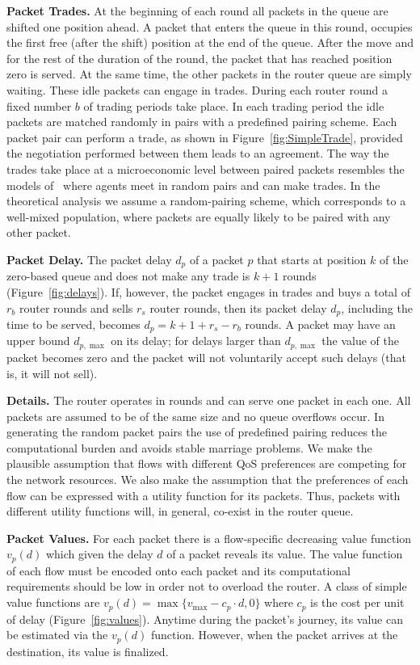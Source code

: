 \documentclass[letterpaper,10pt]{llncs}
\begin{document}
\textbf{Packet Trades.}
At the beginning of each round all packets in the queue are shifted one position ahead.
A packet that enters the queue in this round, occupies the first free (after the shift) 
position at the end of the queue. After the move and for the rest of the duration of the round,
the packet that has reached position zero is served.
At the same time, the other packets
in the router queue are simply waiting. These idle packets can engage in trades.
During each router round a fixed number $b$ of trading periods take place.
In each trading period the idle packets are matched randomly in pairs
with a predefined pairing scheme.
Each packet pair can perform a trade, as shown in Figure~\ref{fig:SimpleTrade},
provided
the negotiation performed between them leads to an agreement.
The way the trades take place at a microeconomic level
between paired packets resembles the models of~\cite{Gi97,KW89}
where agents meet in random pairs and can make trades.
In the theoretical analysis we assume a random-pairing scheme,
which corresponds to a well-mixed population, where packets 
are equally likely to be paired with any other packet. 

\textbf{Packet Delay.}
The packet delay $d_p$ of a packet $p$ that starts at position $k$
of the zero-based queue and does not make any trade is $k+1$ rounds (Figure~\ref{fig:delays}).
If, however, the packet engages in trades and buys a total of $r_b$ router rounds
and sells $r_s$ router rounds, then its packet delay $d_p$, including the time to be served,
becomes $d_p = k + 1 + r_s - r_b$ rounds. A packet may have an upper bound $d_{p,\max}$ on its
delay; for delays larger than $d_{p,\max}$ the value of the packet becomes zero and the packet 
will not voluntarily accept such delays (that is, it will not sell).

\textbf{Details.}
The router operates in rounds and can serve one packet in each one.
All packets are assumed to be of the same size and no queue overflows occur.
In generating the random packet pairs the use of predefined pairing reduces
the computational burden and avoids stable marriage problems.
We make the plausible assumption that flows with different QoS
preferences are competing for the network resources. We also make the
assumption that the preferences of each flow can be expressed with a utility function
for its packets. Thus, packets with different utility functions will, in general, co-exist in 
the router queue.

\textbf{Packet Values.}
For each packet there is a flow-specific decreasing value function $v_p(d)$
which given the delay $d$ of a packet reveals its value. 
The value function of each flow must be encoded
onto each packet and its computational requirements should be low in order not
to overload the router. A class of simple value functions are
$v_p(d) = \max \{ v_{\max} - c_p \cdot d, 0 \}$ where $c_p$ is the cost per unit
of delay (Figure~\ref{fig:values}).
Anytime during the packet's journey, its value can be estimated via the $v_p(d)$ function.
However, when the packet arrives at the destination, its value is finalized. 
\end{document}
